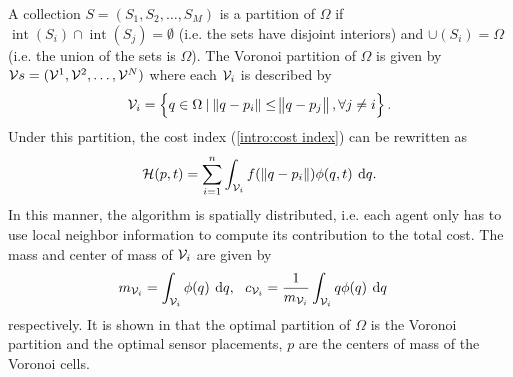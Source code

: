 \documentclass[11pt]{article}
\DeclareMathOperator{\interi}{int}
\begin{document}
A collection $S = (S_1, S_2, \dots, S_M)$ is a partition of $\Omega$ if $\interi(S_i) \cap \interi(S_j) = \emptyset$ (i.e. the sets have disjoint interiors) and $\cup(S_i) = \Omega$ (i.e. the union of the sets is $\Omega$). The Voronoi partition of $\Omega$ is given by $\mathcal{V}s = (\mathcal{V}^1, \mathcal{V}^2, \dots, \mathcal{V}^N)$ where each $\mathcal{V}_i$ is described by 
\begin{equation}
	\displaystyle \mathcal{V}_i = \left\{ q \in \Omega \: | \: \norm{q - p_i} \leq \norm{q - p_j}, \forall j \neq i \right\}.
\end{equation}
Under this partition, the cost index (\ref{intro:cost index}) can be rewritten as 
\begin{equation}
	\displaystyle \mathcal{H}(p,t) = \sum\limits_{i=1}^{n}{\int_{\V_i}{f(\, \norm{q - p_i}) \phi(q, t)\: \dif q}}.
\end{equation}
In this manner, the algorithm is spatially distributed, i.e. each agent only has to use local neighbor information to compute its contribution to the total cost. The mass and center of mass of $\mathcal{V}_i$ are given by 
\begin{align}
	\displaystyle &m_{\V_i} = \int_{\V_i}{\phi(q) \: \dif q}, \:\:\: c_{\V_i} = \frac{1}{m_{\V_i}}\int_{\V_i}{q\phi(q) \: \dif q}
\end{align}
respectively. It is shown in \cite{Nowzari:2012:SCR:2207287.2207546} that the optimal partition of $\Omega$ is the Voronoi partition and the optimal sensor placements, $p$ are the centers of mass of the Voronoi cells. 

\end{document}
